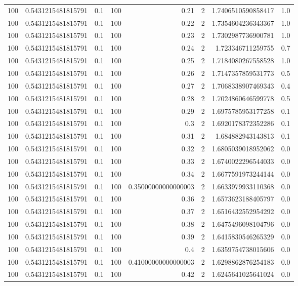 \documentclass[11pt]{article}
\begin{document}
\begin{center}
\begin{tabular}{rrrrrrrr}
100 & 0.5431215481815791 & 0.1 & 100 & 0.21 & 2 & 1.7406510590858417 & 1.0\\
100 & 0.5431215481815791 & 0.1 & 100 & 0.22 & 2 & 1.7354604236343367 & 1.0\\
100 & 0.5431215481815791 & 0.1 & 100 & 0.23 & 2 & 1.7302987736900781 & 1.0\\
100 & 0.5431215481815791 & 0.1 & 100 & 0.24 & 2 & 1.723346711259755 & 0.7\\
100 & 0.5431215481815791 & 0.1 & 100 & 0.25 & 2 & 1.7184080267558528 & 1.0\\
100 & 0.5431215481815791 & 0.1 & 100 & 0.26 & 2 & 1.7147357859531773 & 0.5\\
100 & 0.5431215481815791 & 0.1 & 100 & 0.27 & 2 & 1.7068338907469343 & 0.4\\
100 & 0.5431215481815791 & 0.1 & 100 & 0.28 & 2 & 1.7024860646599778 & 0.5\\
100 & 0.5431215481815791 & 0.1 & 100 & 0.29 & 2 & 1.6975785953177258 & 0.1\\
100 & 0.5431215481815791 & 0.1 & 100 & 0.3 & 2 & 1.6920178372352286 & 0.1\\
100 & 0.5431215481815791 & 0.1 & 100 & 0.31 & 2 & 1.684882943143813 & 0.1\\
100 & 0.5431215481815791 & 0.1 & 100 & 0.32 & 2 & 1.6805039018952062 & 0.0\\
100 & 0.5431215481815791 & 0.1 & 100 & 0.33 & 2 & 1.6740022296544033 & 0.0\\
100 & 0.5431215481815791 & 0.1 & 100 & 0.34 & 2 & 1.6677591973244144 & 0.0\\
100 & 0.5431215481815791 & 0.1 & 100 & 0.35000000000000003 & 2 & 1.6633979933110368 & 0.0\\
100 & 0.5431215481815791 & 0.1 & 100 & 0.36 & 2 & 1.6573623188405797 & 0.0\\
100 & 0.5431215481815791 & 0.1 & 100 & 0.37 & 2 & 1.6516432552954292 & 0.0\\
100 & 0.5431215481815791 & 0.1 & 100 & 0.38 & 2 & 1.6475496098104796 & 0.0\\
100 & 0.5431215481815791 & 0.1 & 100 & 0.39 & 2 & 1.6415830546265329 & 0.0\\
100 & 0.5431215481815791 & 0.1 & 100 & 0.4 & 2 & 1.6359754738015606 & 0.0\\
100 & 0.5431215481815791 & 0.1 & 100 & 0.41000000000000003 & 2 & 1.6298862876254183 & 0.0\\
100 & 0.5431215481815791 & 0.1 & 100 & 0.42 & 2 & 1.6245641025641024 & 0.0\\

\end{tabular}
\end{center}
\end{document}
